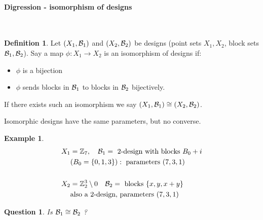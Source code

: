 \documentclass[]{article}
\newtheorem*{quest}{Question}
\theoremstyle{definition}
\newtheorem*{defn}{Definition}
\newtheorem*{exmp}{Example}
\theoremstyle{remark}
\numberwithin{equation}{section}
\begin{document}
			\paragraph*{Digression - isomorphism of designs}\hfill \\
				\begin{defn}
					Let $(X_1, \mathcal B_1)$ and $(X_2, \mathcal B_2)$ be designs (point sets $X_1, X_2$, block sets $\mathcal B_1, \mathcal B_2$). Say a map $\phi: X_1 \to X_2$ is an isomorphism of designs if:
					\begin{itemize}
						\item $\phi$ is a bijection
						\item $\phi$ sends blocks in $\mathcal B_1$ to blocks in $\mathcal B_2$ bijectively.
					\end{itemize}
					If there exists such an isomorphism we say $(X_1, \mathcal B_1) \cong (X_2, \mathcal B_2)$.

					Isomorphic designs have the same parameters, but no converse.
				\end{defn}

				\begin{exmp}
					\begin{align*}
						X_1 &= \ZZ_7, \quad \CB_1 =\ \text{2-design with blocks $B_0 + i$}\\
						  & (B_0 = \{0,1,3\}):\ \text{parameters $(7,3,1)$}\\
						  &\\
						X_2 &= \ZZ_2^3\setminus 0 \quad \CB_2 =\ \text{blocks}\ \{x, y, x+y\}\\
							&\text{also a 2-design, parameters $(7,3,1)$}
					\end{align*}
				\end{exmp}
				\begin{quest}
					Is $\mathcal B_1 \cong \mathcal B_2$ ?
				\end{quest}
\end{document}
